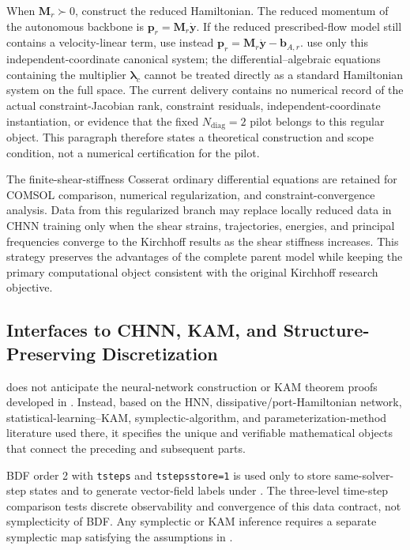 When \(\mathbf{M}_{r}\succ0\), construct the reduced Hamiltonian. The reduced momentum of the autonomous backbone is \(\mathbf{p}_{r}=\mathbf{M}_{r}\dot{\mathbf{y}}\). If the reduced prescribed-flow model still contains a velocity-linear term, use instead \(\mathbf{p}_{r}=\mathbf{M}_{r}\dot{\mathbf{y}}-\mathbf{b}_{A,r}\).  use only this independent-coordinate canonical system; the differential--algebraic equations containing the multiplier \(\bm{\lambda}_{c}\) cannot be treated directly as a standard Hamiltonian system on the full space. The current delivery contains no numerical record of the actual constraint-Jacobian rank, constraint residuals, independent-coordinate instantiation, or evidence that the fixed \(N_{\mathrm{diag}}=2\) pilot belongs to this regular object. This paragraph therefore states a theoretical construction and scope condition, not a numerical certification for the pilot.

The finite-shear-stiffness Cosserat ordinary differential equations are retained for COMSOL comparison, numerical regularization, and constraint-convergence analysis. Data from this regularized branch may replace locally reduced data in CHNN training only when the shear strains, trajectories, energies, and principal frequencies converge to the Kirchhoff results as the shear stiffness increases. This strategy preserves the advantages of the complete parent model while keeping the primary computational object consistent with the original Kirchhoff research objective.

\subsection{Interfaces to CHNN, KAM, and Structure-Preserving Discretization}\label{sec:hamiltonian-3-7}

 does not anticipate the neural-network construction or KAM theorem proofs developed in . Instead, based on the HNN, dissipative/port-Hamiltonian network, statistical-learning--KAM, symplectic-algorithm, and parameterization-method literature used there, it specifies the unique and verifiable mathematical objects that connect the preceding and subsequent parts.\cite{Greydanus2019HNN,Zhong2020Dissipative,Desai2021PHNN,Chen2022KAMSLT,Trabelsi2018DeepComplex,Hirose2012CVNN,FengQin2010,Shang1999KAMAlgorithms,Shang2000KAMMappings,Haro2016Parameterization}

BDF order 2 with \texttt{tsteps} and \texttt{tstepsstore=1} is used only to store same-solver-step states and to generate vector-field labels under . The three-level time-step comparison tests discrete observability and convergence of this data contract, not symplecticity of BDF. Any symplectic or KAM inference requires a separate symplectic map satisfying the assumptions in .

